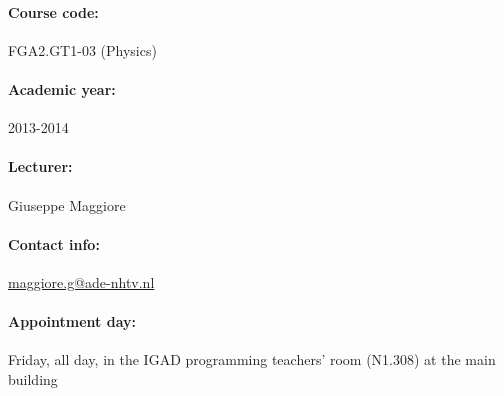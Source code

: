 \documentclass{article}
\begin{document}

\paragraph{Course code:} FGA2.GT1-03 (Physics)

\paragraph{Academic year:} 2013-2014

\paragraph{Lecturer:} Giuseppe Maggiore

\paragraph{Contact info:} \href{mailto:maggiore.g@ade-nhtv.nl}{maggiore.g@ade-nhtv.nl}

\paragraph{Appointment day:} Friday, all day, in the IGAD programming teachers' room (N1.308) at the main building
\end{document}

